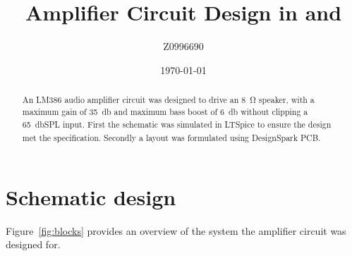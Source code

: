 \documentclass[a4paper,10pt]{article}
\title{Amplifier Circuit Design in \LTSpice and \DesignSparkPcb}
\author{Z0996690}
\date{\today}
\newcommand{\DesignSparkPcb}{DesignSpark
	PCB\textsuperscript{\textregistered}\xspace}
\newcommand{\LTSpice}{LTSpice\textsuperscript{\textregistered}\xspace}
\begin{document}

\begin{abstract}
	An LM386 audio amplifier circuit was designed to drive an \SI{8}{\ohm}
	speaker, with a maximum gain of \SI{35}{\decibel} and maximum bass boost of
	\SI{6}{\decibel} without clipping a \SI{65}{\decibel}SPL input. First the 
	schematic was simulated in \LTSpice to ensure the design met the
	specification. Secondly a layout was formulated using \DesignSparkPcb.
\end{abstract}

\section{Schematic design}

Figure~\ref{fig:blocks} provides an overview of the system the amplifier
circuit was designed for.
\end{document}
